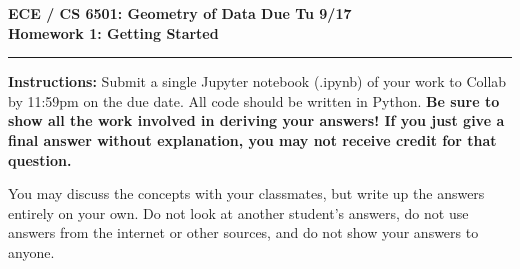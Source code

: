 \documentclass[11pt]{article}
\begin{document}
\thispagestyle{empty}
{\large{\bf ECE / CS 6501: Geometry of Data \hfill Due Tu 9/17}}\\

{\LARGE{\bf Homework 1: Getting Started }}
\vspace{0.2\baselineskip}
\hrule

{\bf Instructions:} Submit a single Jupyter notebook (.ipynb) of your work to
Collab by 11:59pm on the due date. All code should be written in Python. {\bf Be
  sure to show all the work involved in deriving your answers! If you just give
  a final answer without explanation, you may not receive credit for that
  question.}

You may discuss the concepts with your classmates, but write up the answers
entirely on your own. Do not look at another student's answers, do not use
answers from the internet or other sources, and do not show your answers to
anyone.
\end{document}
